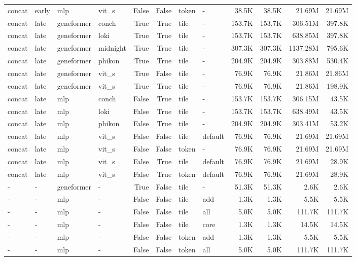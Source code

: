\begin{table}
\begin{tabular}{llllrrllrrrr}
concat & early & mlp & vit\_s & False & False & token & - & 38.5K & 38.5K & 21.69M & 21.69M \\
concat & late & geneformer & conch & True & True & tile & - & 153.7K & 153.7K & 306.51M & 397.8K \\
concat & late & geneformer & loki & True & True & tile & - & 153.7K & 153.7K & 638.85M & 397.8K \\
concat & late & geneformer & midnight & True & True & tile & - & 307.3K & 307.3K & 1137.28M & 795.6K \\
concat & late & geneformer & phikon & True & True & tile & - & 204.9K & 204.9K & 303.88M & 530.4K \\
concat & late & geneformer & vit\_s & True & False & tile & - & 76.9K & 76.9K & 21.86M & 21.86M \\
concat & late & geneformer & vit\_s & True & True & tile & - & 76.9K & 76.9K & 21.86M & 198.9K \\
concat & late & mlp & conch & False & True & tile & - & 153.7K & 153.7K & 306.15M & 43.5K \\
concat & late & mlp & loki & False & True & tile & - & 153.7K & 153.7K & 638.49M & 43.5K \\
concat & late & mlp & phikon & False & True & tile & - & 204.9K & 204.9K & 303.41M & 53.2K \\
concat & late & mlp & vit\_s & False & False & tile & default & 76.9K & 76.9K & 21.69M & 21.69M \\
concat & late & mlp & vit\_s & False & False & token & - & 76.9K & 76.9K & 21.69M & 21.69M \\
concat & late & mlp & vit\_s & False & True & tile & default & 76.9K & 76.9K & 21.69M & 28.9K \\
concat & late & mlp & vit\_s & False & True & token & default & 76.9K & 76.9K & 21.69M & 28.9K \\
- & - & geneformer & - & True & False & tile & - & 51.3K & 51.3K & 2.6K & 2.6K \\
- & - & mlp & - & False & False & tile & add & 1.3K & 1.3K & 5.5K & 5.5K \\
- & - & mlp & - & False & False & tile & all & 5.0K & 5.0K & 111.7K & 111.7K \\
- & - & mlp & - & False & False & tile & core & 1.3K & 1.3K & 14.5K & 14.5K \\
- & - & mlp & - & False & False & token & add & 1.3K & 1.3K & 5.5K & 5.5K \\
- & - & mlp & - & False & False & token & all & 5.0K & 5.0K & 111.7K & 111.7K \\

\end{tabular}
\end{table}
